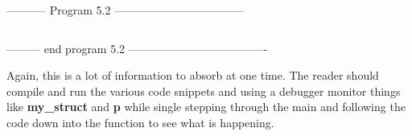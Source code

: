 -----------  Program 5.2  -----------------------------------
\inputminted{c}{../src/ch5-2.c}
--------- end program 5.2 -------------------------------------

Again, this is a lot of information to absorb at one time. The reader
should compile and run the various code snippets and using a debugger
monitor things like \textbf{my\_struct} and \textbf{p} while single
stepping through the main and following the code down into the function
to see what is happening.\\

\begin{comment}
\href{ch6x.htm}{Chapter 6: More on Strings and Arrays of Strings}

\href{pointers.htm}{Back to Table of Contents}
\end{comment}
